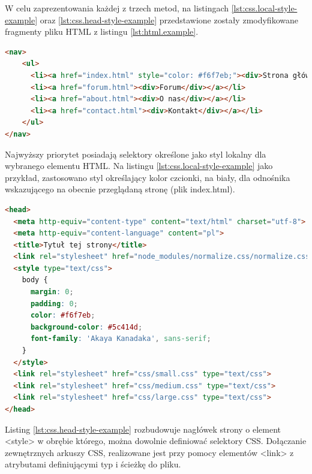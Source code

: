W celu zaprezentowania każdej z trzech metod, na listingach  \ref{lst:css.local-style-example} oraz \ref{lst:css.head-style-example} przedstawione zostały zmodyfikowane fragmenty pliku HTML z listingu \ref{lst:html.example}.

\begin{lstlisting}[language=HTML, caption=Przykład stylu lokalnego CSS w dokumencie HTML, label=lst:css.local-style-example]
<nav>
    <ul>
      <li><a href="index.html" style="color: #f6f7eb;"><div>Strona główna</div></a></li>
      <li><a href="forum.html"><div>Forum</div></a></li>
      <li><a href="about.html"><div>O nas</div></a></li>
      <li><a href="contact.html"><div>Kontakt</div></a></li>
    </ul>
</nav>
\end{lstlisting}

Najwyższy priorytet posiadają selektory określone jako styl lokalny dla wybranego elementu HTML. Na listingu \ref{lst:css.local-style-example} jako przykład, zastosowano styl określający kolor czcionki, na biały,  dla odnośnika wskazującego na obecnie przeglądaną stronę (plik index.html).

\begin{lstlisting}[language=HTML, caption=Przykład stylów CSS zastosowanych przy pomocy nagłówka dokumentu HTML, label=lst:css.head-style-example]
<head>
  <meta http-equiv="content-type" content="text/html" charset="utf-8">
  <meta http-equiv="content-language" content="pl">
  <title>Tytuł tej strony</title>
  <link rel="stylesheet" href="node_modules/normalize.css/normalize.css" type="text/css">
  <style type="text/css">
    body {
      margin: 0;
      padding: 0;
      color: #f6f7eb;
      background-color: #5c414d;
      font-family: 'Akaya Kanadaka', sans-serif;
    }
  </style>
  <link rel="stylesheet" href="css/small.css" type="text/css">
  <link rel="stylesheet" href="css/medium.css" type="text/css">
  <link rel="stylesheet" href="css/large.css" type="text/css">
</head>
\end{lstlisting}

Listing \ref{lst:css.head-style-example} rozbudowuje nagłówek strony o element <style> w obrębie którego, można dowolnie definiować selektory CSS. Dołączanie zewnętrznych arkuszy CSS, realizowane jest przy pomocy elementów <link> z atrybutami definiującymi typ i ścieżkę do pliku.

